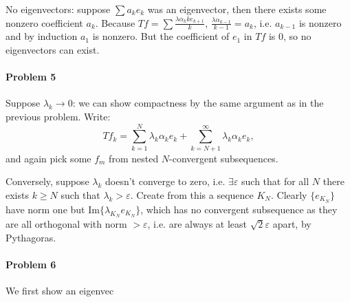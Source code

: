 \documentclass[12pt]{article}
\begin{document}
No eigenvectors: suppose $\sum a_ke_k$ was an eigenvector, then there exists
some nonzero coefficient $a_k$. Because $Tf = \sum \frac{\lambda \alpha_{k}{k}
  e_{k+1}}{k}$, $\frac{\lambda\alpha_{k-1}}{k-1} = a_k$, i.e. $a_{k-1}$ is
nonzero and by induction $a_1$ is nonzero. But the coefficient of $e_1$ in $Tf$
is 0, so no eigenvectors can exist.



\paragraph{Problem 5}

Suppose $\lambda_k \to 0$: we can show compactness by the same argument as in
the previous problem. Write:
\begin{displaymath}
  Tf_k = \sum_{k=1}^N\lambda_k\alpha_ke_k + \sum_{k=N+1}^\infty\lambda_k\alpha_ke_k,
\end{displaymath}
and again pick some $f_m$ from nested $N$-convergent subsequences.

Conversely, suppose $\lambda_k$ doesn't converge to zero, i.e. $\exists
\varepsilon$ such that for all $N$ there exists $k \geq N$ such that $\lambda_k
> \varepsilon$. Create from this a sequence $K_N$. Clearly $\{e_{K_N}\}$ have
norm one but Im$\{\lambda_{K_N}e_{K_N}\}$, which has no convergent subsequence
as they are all orthogonal with norm $> \varepsilon$, i.e. are always at least
$\sqrt{2}\varepsilon$ apart, by Pythagoras.

\paragraph{Problem 6}

We first show an eigenvec
\end{document}
